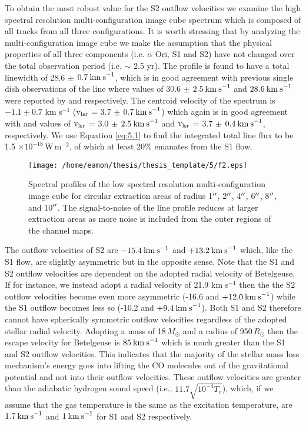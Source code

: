 To obtain the most robust value for the S2 outflow velocities we examine the high spectral resolution multi-configuration image cube spectrum which is composed of all tracks from all three configurations. It is worth stressing that by analyzing the multi-configuration image cube we make the assumption that the physical properties of all three components (i.e. $\alpha$ Ori, S1 and S2) have not changed over the total observation period (i.e. $\sim$ 2.5 yr). The profile is found to have a total linewidth of 28.6 $\pm$ $0.7\>{\rm km\>s}^{-1}$, which is in good agreement with previous single dish observations of the line where values of 30.6 $\pm$ $2.5\>{\rm km\>s}^{-1}$ and $28.6\>{\rm km\>s}^{-1}$ were reported by \cite{knapp_1980} and \cite{huggins_1987} respectively. The centroid velocity of the spectrum is  $-1.1 \pm 0.7$ km s$^{-1}$ ($\rm{v_{\rm{lsr}}}$ = 3.7 $\pm$ $0.7\>{\rm km\>s}^{-1}$) which again is in good agreement with \cite{knapp_1980} and \cite{huggins_1987} values of $\rm{v_{lsr}}$ = 3.0 $\pm$ $2.5\>{\rm km\>s}^{-1}$ and $\rm{v_{lsr}}$ = 3.7 $\pm$ $0.4\>{\rm km\>s}^{-1}$, respectively. We use Equation \ref{eq:5.1} to find the integrated total line flux to be 1.5 $\times 10^{-18}$\,W\,m$^{-2}$, of which at least 20\% emanates from the S1 flow.

\begin{figure}[!ht]
\centering 
\texttt{[image: /home/eamon/thesis/thesis\_template/5/f2.eps]}
\caption{Spectral profiles of the low spectral resolution multi-configuration image cube for circular extraction areas of radius 1$^{\prime\prime}$, 2$^{\prime\prime}$, 4$^{\prime\prime}$, 6$^{\prime\prime}$, 8$^{\prime\prime}$, and 10$^{\prime\prime}$. The signal-to-noise of the line profile reduces at larger extraction areas as more noise is included from the outer regions of the channel maps.}
\label{fig:5.5}
\end{figure}

The outflow velocities of S2 are $-15.4\>{\rm km\>s}^{-1}$ and $+13.2\>{\rm km\>s}^{-1}$ which, like the S1 flow, are slightly asymmetric but in the opposite sense. Note that the S1 and S2 outflow velocities are dependent on the adopted radial velocity of Betelgeuse. If for instance, we instead adopt a radial velocity of 21.9 km s${}^{-1}$ \citep{famaey_2005} then the the S2 outflow velocities become even more asymmetric (-16.6 and $+12.0\>{\rm km\>s}^{-1}$) while the S1 outflow becomes less so (-10.2 and $+9.4\>{\rm km\>s}^{-1}$). Both S1 and S2 therefore cannot have spherically symmetric outflow velocities regardless of the adopted stellar radial velocity. Adopting a mass of 18\,$M_{\odot}$ \citep{meynet_2003} and a radius of 950\,$R_{\odot}$ \citep{harper_2008} then the escape velocity for Betelgeuse is $85\>{\rm km\>s}^{-1}$ which is much greater than the S1 and S2 outflow velocities. This indicates that the majority of the stellar mass loss mechanism's energy goes into lifting the CO molecules out of the gravitational potential and not into their outflow velocities. These outflow velocities are greater than the adiabatic hydrogen sound speed (i.e., $11.7\sqrt{10^{-4}T_{e}}$), which, if we assume that the gas temperature is the same as the excitation temperature, are $1.7\>{\rm km\>s}^{-1}$ and $1\>{\rm km\>s}^{-1}$ for S1 and S2 respectively. 

